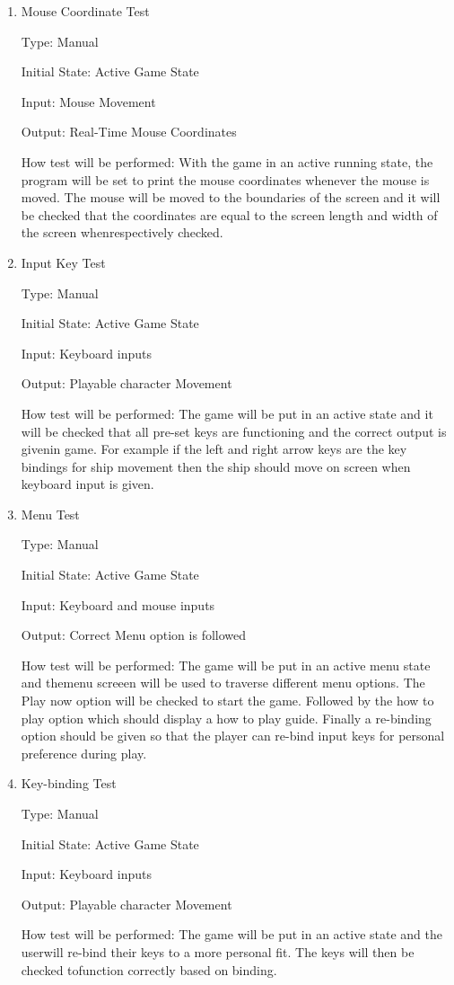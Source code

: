 \documentclass[12pt, titlepage]{article}
\begin{document}
\begin{enumerate}

\item{Mouse Coordinate Test\\}

Type: Manual 
					
Initial State: Active Game State 
					
Input: Mouse Movement 
					
Output: Real-Time Mouse Coordinates 
					
How test will be performed: With the game in an active running state, the
program will be set to print the mouse coordinates whenever the mouse is moved.
The mouse will be moved to the boundaries of the screen and it will be checked
that the coordinates are equal to the screen length and width of the screen
whenrespectively checked. %
					
\item{Input Key Test\\}

Type: Manual 
					
Initial State: Active Game State 
					
Input: Keyboard inputs
					
Output: Playable character Movement
					
How test will be performed: The game will be put in an active state and it will
be checked that all pre-set keys are functioning and the correct output is
givenin game. For example if the left and right arrow keys are the key bindings
for
ship movement then the ship should move on screen when keyboard input is given.


\item{Menu Test\\}

Type: Manual
					
Initial State: Active Game State
					
Input: Keyboard and mouse inputs 
					
Output: Correct Menu option is followed 
					
How test will be performed: The game will be put in an active menu state and
themenu%
screeen will be used to traverse different menu options. The Play now
option will be checked to start the game. Followed by the how to play option
which should display a how to play guide. Finally a re-binding option should be
given so that the player can re-bind input keys for personal preference during
play.


\item{Key-binding Test\\}

Type: Manual

Initial State: Active Game State 

Input: Keyboard inputs

Output: Playable character Movement

How test will be performed: The game will be put in an active state and the
userwill re-bind their keys to a more personal fit. The keys will then be
checked tofunction correctly based on binding.

\end{enumerate}
\end{document}
